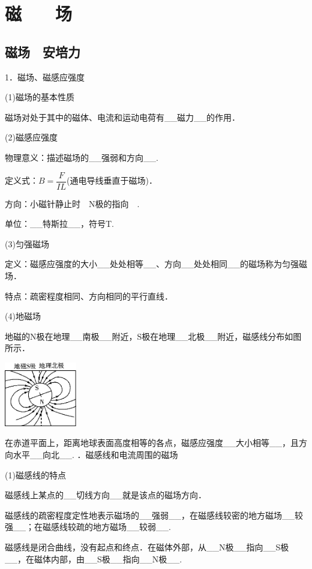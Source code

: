 \chapter{磁　　场}

\section{磁场　安培力}

1．磁场、磁感应强度

(1)磁场的基本性质

磁场对处于其中的磁体、电流和运动电荷有\_\_磁力\_\_的作用．

(2)磁感应强度

物理意义：描述磁场的\_\_强弱和方向\_\_.

定义式：$B=\dfrac{F}{I L}$(通电导线垂直于磁场)．

方向：小磁针静止时　N极的指向　.

单位：\_\_特斯拉\_\_，符号T.

(3)匀强磁场

定义：磁感应强度的大小\_\_处处相等\_\_、方向\_\_处处相同\_\_的磁场称为匀强磁场．

特点：疏密程度相同、方向相同的平行直线．

(4)地磁场

地磁的N极在地理\_\_南极\_\_附近，S极在地理\_\_北极\_\_附近，磁感线分布如图所示．

\begin{center}\includegraphics[width=1.24514in,height=1.10347in]{media/image335.png}\end{center}

在赤道平面上，距离地球表面高度相等的各点，磁感应强度\_\_大小相等\_\_，且方向水平\_\_向北\_\_.
．磁感线和电流周围的磁场

(1)磁感线的特点

磁感线上某点的\_\_切线方向\_\_就是该点的磁场方向．

磁感线的疏密程度定性地表示磁场的\_\_强弱\_\_，在磁感线较密的地方磁场\_\_较强\_\_；在磁感线较疏的地方磁场\_\_较弱\_\_.

磁感线是闭合曲线，没有起点和终点．在磁体外部，从\_\_N极\_\_指向\_\_S极\_\_，在磁体内部，由\_\_S极\_\_指向\_\_N极\_\_.

